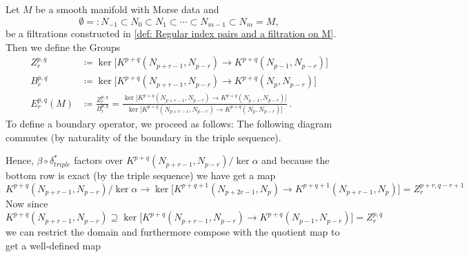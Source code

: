 \begin{definition} Let $M$ be a smooth manifold with Morse data and \begin{equation*}
		\emptyset=:N_{-1}\subset N_0\subset N_1\subset \cdots \subset N_{m-1}\subset N_m=M,
	\end{equation*} be a filtrations constructed in \ref{def: Regular index pairs and a filtration on M}. Then we define the Groups
	\begin{align*}
		Z^{p,q}_r	&\coloneq \ker\big[K^{p+q}(N_{p+r-1},N_{p-r})\to K^{p+q}(N_{p-1},N_{p-r})  \big]\\
		B^{p,q}_r	&\coloneq \ker\big[K^{p+q}(N_{p+r-1},N_{p-r})\to K^{p+q}(N_{p  },N_{p-r})  \big] \\
		E^{p,q}_r(M)&\coloneq \frac{	Z^{p,q}_r}{B^{p,q}_r}=\frac{\ker\big[K^{p+q}(N_{p+r-1},N_{p-r})\to K^{p+q}(N_{p-1},N_{p-r})  \big]}{\ker\big[K^{p+q}(N_{p+r-1},N_{p-r})\to K^{p+q}(N_{p},N_{p-r})\big]} \, .
	\end{align*} To define a boundary operator, we proceed as follows:
	The following diagram commutes (by naturality of the boundary in the triple sequence).
	\begin{center}
	\end{center} Hence, $\beta\circ \delta^*_{triple}$ factors over ${K^{p+q}(N_{p+r-1},N_{p-r})}\slash \ker \alpha$ and because the bottom row is exact (by the triple sequence) we have get a map 
	\begin{equation*}
		{K^{p+q}(N_{p+r-1},N_{p-r})}\slash \ker \alpha \to \ker\big[K^{p+q+1}(N_{p+2r-1},N_{p})\to K^{p+q+1}(N_{p+r-1},N_{p})  \big]=Z^{p+r,q-r+1}_r
	\end{equation*} Now since ${K^{p+q}(N_{p+r-1},N_{p-r})}\supseteq \ker\big[K^{p+q}(N_{p+r-1},N_{p-r})\to K^{p+q}(N_{p-1},N_{p-r})  \big]=Z^{p,q}_r$ we can restrict the domain and furthermore compose with the quotient map to get a well-defined map

\end{definition}
